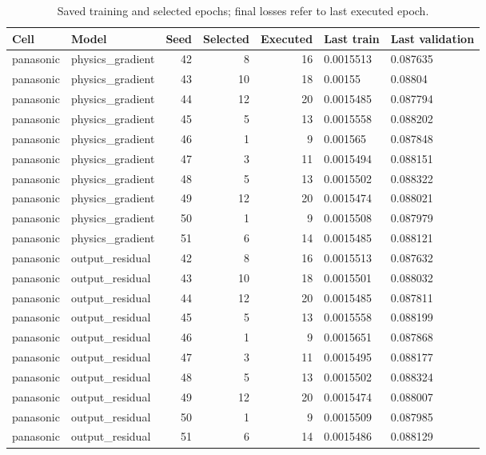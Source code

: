 \begin{table}[!t]
\centering
\footnotesize
\caption{Saved training and selected epochs; final losses refer to last executed epoch.}
\label{tab:reviewer-epochs-1}
\setlength{\tabcolsep}{3pt}
\begin{tabular}{llrrr p{} p{}}
\toprule
Cell & Model & Seed & Selected & Executed & Last train & Last validation \\
\midrule
panasonic & physics\_gradient & 42 & 8 & 16 & 0.0015513 & 0.087635 \\
panasonic & physics\_gradient & 43 & 10 & 18 & 0.00155 & 0.08804 \\
panasonic & physics\_gradient & 44 & 12 & 20 & 0.0015485 & 0.087794 \\
panasonic & physics\_gradient & 45 & 5 & 13 & 0.0015558 & 0.088202 \\
panasonic & physics\_gradient & 46 & 1 & 9 & 0.001565 & 0.087848 \\
panasonic & physics\_gradient & 47 & 3 & 11 & 0.0015494 & 0.088151 \\
panasonic & physics\_gradient & 48 & 5 & 13 & 0.0015502 & 0.088322 \\
panasonic & physics\_gradient & 49 & 12 & 20 & 0.0015474 & 0.088021 \\
panasonic & physics\_gradient & 50 & 1 & 9 & 0.0015508 & 0.087979 \\
panasonic & physics\_gradient & 51 & 6 & 14 & 0.0015485 & 0.088121 \\
panasonic & output\_residual & 42 & 8 & 16 & 0.0015513 & 0.087632 \\
panasonic & output\_residual & 43 & 10 & 18 & 0.0015501 & 0.088032 \\
panasonic & output\_residual & 44 & 12 & 20 & 0.0015485 & 0.087811 \\
panasonic & output\_residual & 45 & 5 & 13 & 0.0015558 & 0.088199 \\
panasonic & output\_residual & 46 & 1 & 9 & 0.0015651 & 0.087868 \\
panasonic & output\_residual & 47 & 3 & 11 & 0.0015495 & 0.088177 \\
panasonic & output\_residual & 48 & 5 & 13 & 0.0015502 & 0.088324 \\
panasonic & output\_residual & 49 & 12 & 20 & 0.0015474 & 0.088007 \\
panasonic & output\_residual & 50 & 1 & 9 & 0.0015509 & 0.087985 \\
panasonic & output\_residual & 51 & 6 & 14 & 0.0015486 & 0.088129 \\
\bottomrule
\end{tabular}
\end{table}

